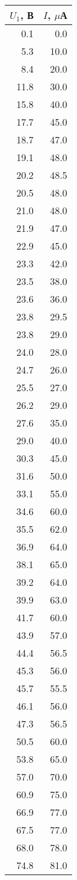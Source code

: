 \begin{tabular}{rr}
\toprule
   $U_1$, В &     $I$, $\mu$А \\
\midrule
 0.1 &  0.0 \\
 5.3 & 10.0 \\
 8.4 & 20.0 \\
11.8 & 30.0 \\
15.8 & 40.0 \\
17.7 & 45.0 \\
18.7 & 47.0 \\
19.1 & 48.0 \\
20.2 & 48.5 \\
20.5 & 48.0 \\
21.0 & 48.0 \\
21.9 & 47.0 \\
22.9 & 45.0 \\
23.3 & 42.0 \\
23.5 & 38.0 \\
23.6 & 36.0 \\
23.8 & 29.5 \\
23.8 & 29.0 \\
24.0 & 28.0 \\
24.7 & 26.0 \\
25.5 & 27.0 \\
26.2 & 29.0 \\
27.6 & 35.0 \\
29.0 & 40.0 \\
30.3 & 45.0 \\
31.6 & 50.0 \\
33.1 & 55.0 \\
34.6 & 60.0 \\
35.5 & 62.0 \\
36.9 & 64.0 \\
38.1 & 65.0 \\
39.2 & 64.0 \\
39.9 & 63.0 \\
41.7 & 60.0 \\
43.9 & 57.0 \\
44.4 & 56.5 \\
45.3 & 56.0 \\
45.7 & 55.5 \\
46.1 & 56.0 \\
47.3 & 56.5 \\
50.5 & 60.0 \\
53.8 & 65.0 \\
57.0 & 70.0 \\
60.9 & 75.0 \\
66.9 & 77.0 \\
67.5 & 77.0 \\
68.0 & 78.0 \\
74.8 & 81.0 \\
\bottomrule
\end{tabular}

